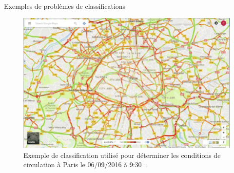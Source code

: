 \documentclass[8pt]{beamer}
\begin{document}
		\begin{frame}{Exemples de problèmes de classifications}
			\begin{figure}[H]
				\includegraphics[width=.65\textwidth]{images/samples/traffic_paris}
				\caption*{\tiny Exemple de classification utilisé pour déterminer les conditions de circulation à Paris le 06/09/2016 à 9:30~\cite{tutic2016google}.}
			\end{figure}
		\end{frame}



\end{document}
